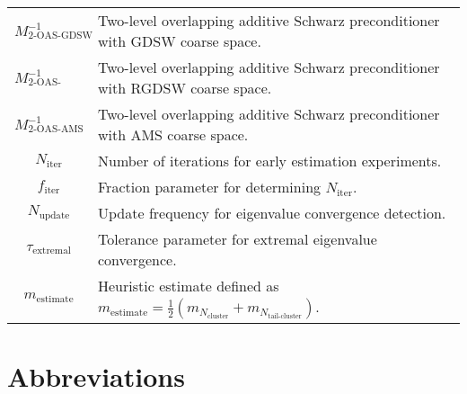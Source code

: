 \begin{longtable}{c p{10cm}}
    $M^{-1}_{\text{2-OAS-GDSW}}$                       & Two-level overlapping additive Schwarz preconditioner with GDSW coarse space.                                            \\
    $M^{-1}_{\text{2-OAS-RGDSW}}$                      & Two-level overlapping additive Schwarz preconditioner with RGDSW coarse space.                                           \\
    $M^{-1}_{\text{2-OAS-AMS}}$                        & Two-level overlapping additive Schwarz preconditioner with AMS coarse space.                                             \\
    $N_{\text{iter}}$                                  & Number of iterations for early estimation experiments.                                                                   \\
    $f_{\text{iter}}$                                  & Fraction parameter for determining $N_{\text{iter}}$.                                                                    \\
    $N_{\text{update}}$                                & Update frequency for eigenvalue convergence detection.                                                                   \\
    $\tau_{\text{extremal}}$                           & Tolerance parameter for extremal eigenvalue convergence.                                                                 \\
    $m_{\text{estimate}}$                              & Heuristic estimate defined as $m_{\text{estimate}} = \frac{1}{2}(m_{N_{\text{cluster}}} + m_{N_{\text{tail-cluster}}})$. \\
\end{longtable}

\section*{Abbreviations}

